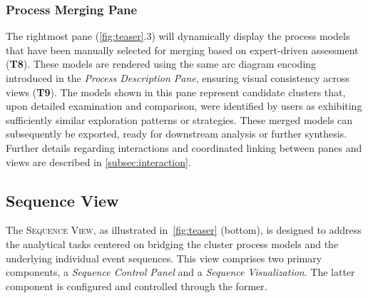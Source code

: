 \documentclass[preprint,journal]{vgtc}            %
\begin{document}
\subsubsection{Process Merging Pane}

The rightmost pane (\cref{fig:teaser}.3) will dynamically display the process models that have been manually selected for merging based on expert-driven assessment (\textbf{T8}).
These models are rendered using the same arc diagram encoding introduced in the \textit{Process Description Pane}, ensuring visual consistency across views (\textbf{T9}).
The models shown in this pane represent candidate clusters that, upon detailed examination and comparison, were identified by users as exhibiting sufficiently similar exploration patterns or strategies. 
These merged models can subsequently be exported, ready for downstream analysis or further synthesis.
Further details regarding interactions and coordinated linking between panes and views are described in \cref{subsec:interaction}.



\subsection{Sequence View}
\label{subsec:sequence_view}

The \textsc{Sequence View}, as illustrated in~\cref{fig:teaser} (bottom), is designed to address the analytical tasks centered on bridging the cluster process models and the underlying individual event sequences.
This view comprises two primary components, a \textit{Sequence Control Panel} and a \textit{Sequence Visualization}.
The latter component is configured and controlled through the former. 
\end{document}
